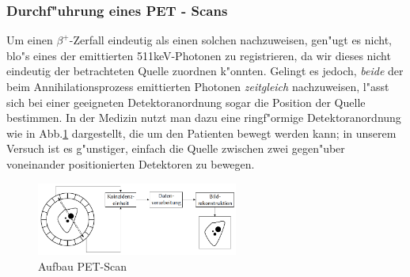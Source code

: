 \documentclass{article}
\begin{document}
\subsubsection{Durchf"uhrung eines PET - Scans}

Um einen $\beta^+$-Zerfall eindeutig als einen solchen nachzuweisen, gen"ugt es nicht, blo"s eines der emittierten 511keV-Photonen zu registrieren, da wir dieses nicht eindeutig der betrachteten Quelle zuordnen k"onnten. Gelingt es jedoch, \textit{beide} der beim Annihilationsprozess emittierten Photonen \textit{zeitgleich} nachzuweisen, l"asst sich bei einer geeigneten Detektoranordnung sogar die Position der Quelle bestimmen. In der Medizin nutzt man dazu eine ringf"ormige Detektoranordnung wie in Abb.\ref{figPET} dargestellt, die um den Patienten bewegt werden kann; in unserem Versuch ist es g"unstiger, einfach die Quelle zwischen zwei gegen"uber voneinander positionierten Detektoren zu bewegen.

\begin{figure}[!ht]
	\centering
	\includegraphics[width=250px, totalheight=250px, keepaspectratio]{PETScanAufbau.PNG}
	\caption[Aufbau PET-Scan]{Aufbau PET-Scan\footnotemark}
	\label{figPET}
\end{figure}
\end{document}
